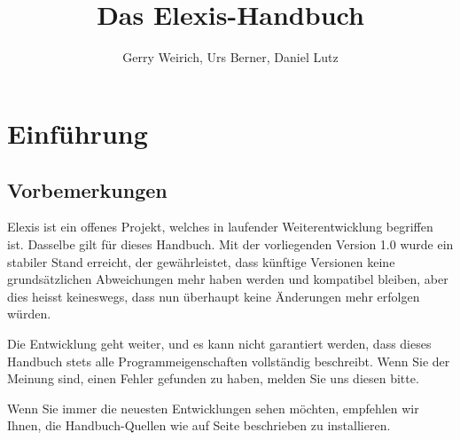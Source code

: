 \documentclass[paper=a4,BCOR8.25mm,twoside]{scrbook}
\author{Gerry Weirich, Urs Berner, Daniel Lutz}
\title{Das Elexis\textsuperscript{\textregistered}-Handbuch}
\begin{document}
\maketitle
%
\tableofcontents
\part{Einführung}
\chapter{Vorbemerkungen}
Elexis ist ein offenes Projekt, welches in laufender Weiterentwicklung begriffen ist. Dasselbe gilt für dieses Handbuch. Mit der vorliegenden Version 1.0 wurde ein stabiler Stand erreicht, der gewährleistet, dass künftige Versionen keine grundsätzlichen Abweichungen mehr haben werden und kompatibel bleiben, aber dies heisst keineswegs, dass nun überhaupt keine Änderungen mehr erfolgen würden.

Die Entwicklung geht weiter, und es kann nicht garantiert werden, dass dieses Handbuch stets alle Programmeigenschaften vollständig beschreibt. Wenn Sie der Meinung sind, einen Fehler gefunden zu haben, melden Sie uns diesen bitte.

Wenn Sie immer die neuesten Entwicklungen sehen möchten, empfehlen wir Ihnen,
die Handbuch-Quellen wie auf Seite \pageref{dokumentation} beschrieben zu
installieren.
\bigskip
\end{document}
